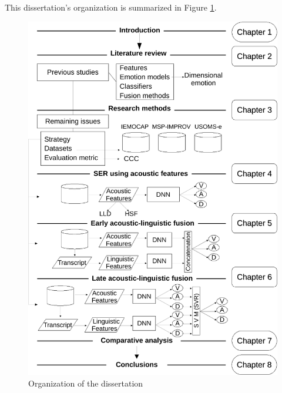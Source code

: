 This dissertation's organization is summarized in Figure
\ref{fig:dissertation_org}. 

\begin{figure}[htbp]
    \centering
    \includegraphics[width=.95\textwidth]{../fig/dissertation_org-crop.pdf}
    \caption{Organization of the dissertation}
    \label{fig:dissertation_org}
\end{figure}

